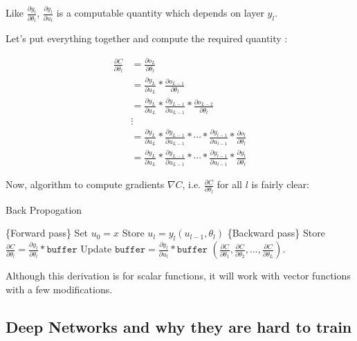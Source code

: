 \documentclass[a4paper]{tufte-handout}
\begin{document}
Like \(\frac{\partial y_l}{\partial \theta_l}\),
\(\frac{\partial y_l}{\partial u_l}\) is a computable quantity which
depends on layer \(y_l\).

\noindent Let's put everything together and compute the required quantity
:

\begin{align*}
\frac{\partial C}{\partial \theta_l} &= \frac{\partial o_L}{\partial \theta_l}\\
&= \frac{\partial y_L}{\partial u_L} * \frac{\partial o_{L-1}}{\partial \theta_l}\\
&= \frac{\partial y_L}{\partial u_L} * \frac{\partial y_{L-1}}{\partial u_{L-1}} * \frac{\partial o_{L-2}}{\partial \theta_l} \\
&\vdots \\
&= \frac{\partial y_L}{\partial u_L} * \frac{\partial y_{L-1}}{\partial u_{L-1}} * \cdots * \frac{\partial y_{l-1}}{\partial u_{l-1}} * \frac{\partial o_l}{\partial \theta_l}\\
&= \frac{\partial y_L}{\partial u_L} * \frac{\partial y_{L-1}}{\partial u_{L-1}} * \cdots * \frac{\partial y_{l-1}}{\partial u_{l-1}} * \frac{\partial y_l}{\partial \theta_l}
\end{align*}

Now, algorithm to compute gradients \(\nabla C\), i.e.
\(\frac{\partial C}{\partial \theta_l}\) for all \(l\) is fairly clear:

\begin{algorithm}[H]
\caption{Back Propogation}
\begin{algorithmic}[1]
  \STATE \{Forward pass\}
  \STATE Set \(u_0 = x\)
  	\STATE Store \(u_l = y_l(u_{l-1}, \theta_l)\)
  \ENDFOR
  \STATE \{Backward pass\}
  	\STATE Store \(\frac{\partial C}{\partial \theta_l} = \frac{\partial y_l}{\partial \theta_l} * \texttt{buffer}\)
  	\STATE Update \(\texttt{buffer} = \frac{\partial y_l}{\partial u_l} * \texttt{buffer}\)
  \ENDFOR 
  \RETURN \(\left(\frac{\partial C}{\partial\theta_1}, \frac{\partial C}{\partial\theta_2}, \ldots, \frac{\partial C}{\partial\theta_L}\right)\).
\end{algorithmic}
\end{algorithm}


Although this derivation is for scalar functions, it will work with
vector functions with a few modifications.

\subsection{Deep Networks and why they are hard to train}\label{deep-neural-networks}
\end{document}
